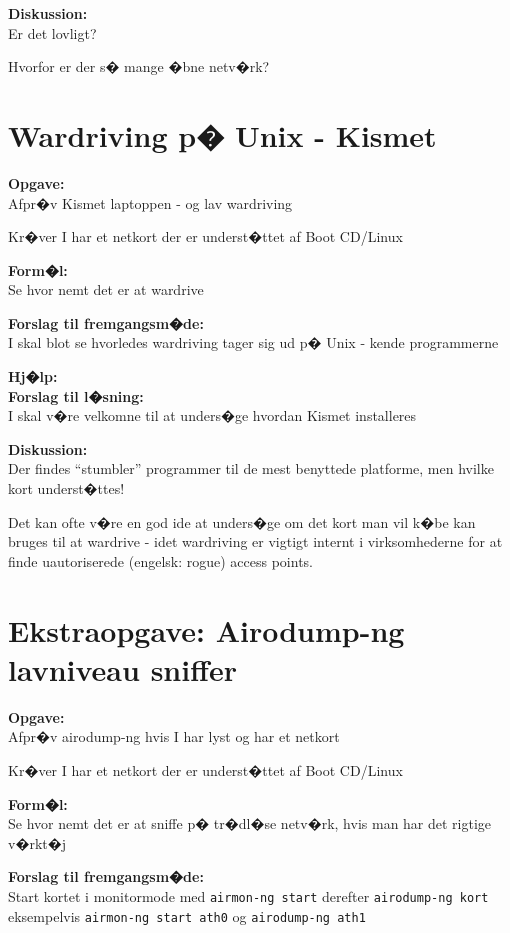 \documentclass[a4paper,11pt,notitlepage]{oevelser}
\begin{document}
{\bfseries Diskussion:}\\
Er det lovligt?

Hvorfor er der s� mange �bne netv�rk?


\chapter{Wardriving p� Unix - Kismet}
\label{ex:wardriving-kismet}

{\bfseries Opgave:}\\
Afpr�v Kismet laptoppen - og lav wardriving

Kr�ver I har et netkort der er underst�ttet af Boot CD/Linux

{\bfseries Form�l:}\\
Se hvor nemt det er at wardrive

{\bfseries Forslag til fremgangsm�de:}\\
I skal blot se hvorledes wardriving tager sig ud p� Unix - kende
programmerne

{\bfseries Hj�lp:}\\

{\bfseries Forslag til l�sning:}\\
I skal v�re velkomne til at unders�ge hvordan Kismet installeres

{\bfseries Diskussion:}\\
Der findes ``stumbler'' programmer til de mest benyttede platforme,
men hvilke kort underst�ttes!

Det kan ofte v�re en god ide at unders�ge om det kort man vil k�be kan
bruges til at wardrive - idet wardriving er vigtigt internt i
virksomhederne for at finde uautoriserede (engelsk: rogue) access
points.

\chapter{Ekstraopgave: Airodump-ng lavniveau sniffer}
\label{ex:airodump}


{\bfseries Opgave:}\\
Afpr�v airodump-ng hvis I har lyst og har et netkort

Kr�ver I har et netkort der er underst�ttet af Boot CD/Linux

{\bfseries Form�l:}\\
Se hvor nemt det er at sniffe p� tr�dl�se netv�rk, hvis man har det rigtige v�rkt�j

{\bfseries Forslag til fremgangsm�de:}\\
Start kortet i monitormode med \verb+airmon-ng start+ derefter \verb+airodump-ng kort+\\
eksempelvis \verb+airmon-ng start ath0+ og \verb+airodump-ng ath1+
\end{document}
